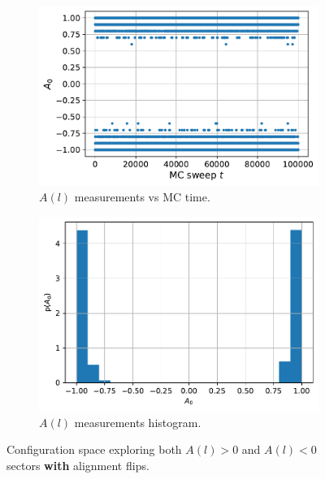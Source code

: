 \documentclass[../journal_main.tex]{subfiles}
\begin{document}
\begin{figure}[!htb]
    \centering
    \begin{subfigure}[b]{0.47\textwidth}
        \centering
        \includegraphics[width=\textwidth]{images/fix_subsystem_symmetry/measurement A(l) vs MC time (l=0).pdf}
        \caption{ $A(l)$ measurements vs MC time.}
    \end{subfigure}
    \hspace{1em}  %
    \begin{subfigure}[b]{0.45\textwidth}
        \centering
        \includegraphics[width=\textwidth]{images/fix_subsystem_symmetry/measurement A(l) histogram (l=0).pdf}
        \caption{ $A(l)$ measurements histogram.}
    \end{subfigure}
    \caption{Configuration space exploring both $A(l)>0$ and $A(l)<0$ sectors \textbf{with} alignment flips.}
    \label{alignflipmeasurements}
\end{figure}
\FloatBarrier
\end{document}
